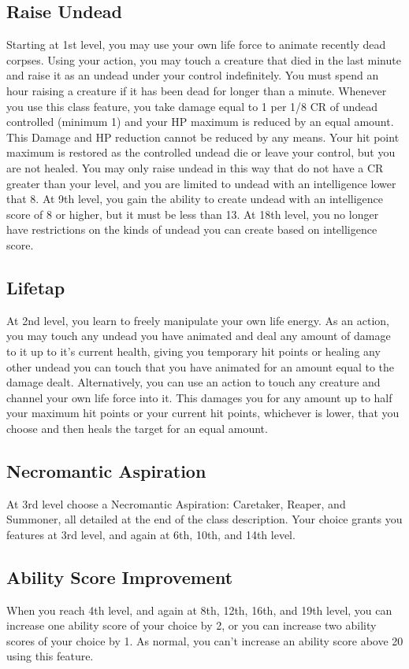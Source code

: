 \documentclass[10pt,twoside,twocolumn,openany]{book}
\begin{document}
\subsection{Raise Undead}
Starting at 1st level, you may use your own life force to animate recently dead corpses. Using your action, you may touch a creature that died in the last minute and raise it as an undead under your control indefinitely.  You must spend an hour raising a creature if it has been dead for longer than a minute. Whenever you use this class feature, you take damage equal to 1 per 1/8 CR of undead controlled (minimum 1) and your HP maximum is reduced by an equal amount. This Damage and HP reduction cannot be reduced by any means. Your hit point maximum is restored as the controlled undead die or leave your control, but you are not healed. You may only raise undead in this way that do not have a CR greater than your level, and you are limited to undead with an intelligence lower that 8. At 9th level, you gain the ability to create undead with an intelligence score of 8 or higher, but it must be less than 13. At 18th level, you no longer have restrictions on the kinds of undead you can create based on intelligence score.

\subsection{Lifetap}
At 2nd level, you learn to freely manipulate your own life energy. As an action, you may touch any undead you have animated and deal any amount of damage to it up to it’s current health, giving you temporary hit points or healing any other undead you can touch that you have animated for an amount equal to the damage dealt. Alternatively, you can use an action to touch any creature and channel your own life force into it. This damages you for any amount up to half your maximum hit points or your current hit points, whichever is lower, that you choose and then heals the target for an equal amount.

\subsection{Necromantic Aspiration}
At 3rd level choose a Necromantic Aspiration: Caretaker, Reaper, and Summoner, all detailed at the end of the class description. Your choice grants you features at 3rd level, and again at 6th, 10th, and 14th level.

\subsection{Ability Score Improvement}
When you reach 4th level, and again at 8th, 12th, 16th, and 19th level, you can increase one ability score of your choice by 2, or you can increase two ability scores of your choice by 1. As normal, you can’t increase an ability score above 20 using this feature.
\end{document}
